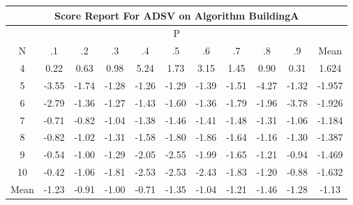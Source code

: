 \documentclass[11pt,a4paper]{report}
\begin{document}
\begin{longtable}{ | c || c | c | c | c | c | c | c | c | c || c |}
\hline
\multicolumn{11}{|c|}{ Score Report For ADSV on Algorithm BuildingA} \\
\hline
\multicolumn{11}{|c|}{ P } \\
\hline
N & .1 & .2 & .3 & .4 & .5 & .6 & .7 & .8 & .9 & Mean\\
 \hline
 \hline
 \endhead
  4 &  \cellcolor[HTML]{F7F7FF} 0.22 &  \cellcolor[HTML]{EFEFFF} 0.63 &  \cellcolor[HTML]{E7E7FF} 0.98 &  \cellcolor[HTML]{8080FF} 5.24 &  \cellcolor[HTML]{D7D7FF} 1.73 &  \cellcolor[HTML]{AFAFFF} 3.15 &  \cellcolor[HTML]{D7D7FF} 1.45 &  \cellcolor[HTML]{E7E7FF} 0.90 &  \cellcolor[HTML]{F7F7FF} 0.31 & 1.624 \\
  5 &  \cellcolor[HTML]{FFA7A7} -3.55 &  \cellcolor[HTML]{FFD7D7} -1.74 &  \cellcolor[HTML]{FFDFDF} -1.28 &  \cellcolor[HTML]{FFDFDF} -1.26 &  \cellcolor[HTML]{FFDFDF} -1.29 &  \cellcolor[HTML]{FFDFDF} -1.39 &  \cellcolor[HTML]{FFD7D7} -1.51 &  \cellcolor[HTML]{FF9797} -4.27 &  \cellcolor[HTML]{FFDFDF} -1.32 & -1.957 \\
  6 &  \cellcolor[HTML]{FFB7B7} -2.79 &  \cellcolor[HTML]{FFDFDF} -1.36 &  \cellcolor[HTML]{FFDFDF} -1.27 &  \cellcolor[HTML]{FFDFDF} -1.43 &  \cellcolor[HTML]{FFD7D7} -1.60 &  \cellcolor[HTML]{FFDFDF} -1.36 &  \cellcolor[HTML]{FFCFCF} -1.79 &  \cellcolor[HTML]{FFCFCF} -1.96 &  \cellcolor[HTML]{FF9F9F} -3.78 & -1.926 \\
  7 &  \cellcolor[HTML]{FFEFEF} -0.71 &  \cellcolor[HTML]{FFE7E7} -0.82 &  \cellcolor[HTML]{FFE7E7} -1.04 &  \cellcolor[HTML]{FFDFDF} -1.38 &  \cellcolor[HTML]{FFD7D7} -1.46 &  \cellcolor[HTML]{FFDFDF} -1.41 &  \cellcolor[HTML]{FFD7D7} -1.48 &  \cellcolor[HTML]{FFDFDF} -1.31 &  \cellcolor[HTML]{FFE7E7} -1.06 & -1.184 \\
  8 &  \cellcolor[HTML]{FFE7E7} -0.82 &  \cellcolor[HTML]{FFE7E7} -1.02 &  \cellcolor[HTML]{FFDFDF} -1.31 &  \cellcolor[HTML]{FFD7D7} -1.58 &  \cellcolor[HTML]{FFCFCF} -1.80 &  \cellcolor[HTML]{FFCFCF} -1.86 &  \cellcolor[HTML]{FFD7D7} -1.64 &  \cellcolor[HTML]{FFDFDF} -1.16 &  \cellcolor[HTML]{FFDFDF} -1.30 & -1.387 \\
  9 &  \cellcolor[HTML]{FFEFEF} -0.54 &  \cellcolor[HTML]{FFE7E7} -1.00 &  \cellcolor[HTML]{FFDFDF} -1.29 &  \cellcolor[HTML]{FFCFCF} -2.05 &  \cellcolor[HTML]{FFBFBF} -2.55 &  \cellcolor[HTML]{FFCFCF} -1.99 &  \cellcolor[HTML]{FFD7D7} -1.65 &  \cellcolor[HTML]{FFDFDF} -1.21 &  \cellcolor[HTML]{FFE7E7} -0.94 & -1.469 \\
  10 &  \cellcolor[HTML]{FFF7F7} -0.42 &  \cellcolor[HTML]{FFE7E7} -1.06 &  \cellcolor[HTML]{FFCFCF} -1.81 &  \cellcolor[HTML]{FFBFBF} -2.53 &  \cellcolor[HTML]{FFBFBF} -2.53 &  \cellcolor[HTML]{FFBFBF} -2.43 &  \cellcolor[HTML]{FFCFCF} -1.83 &  \cellcolor[HTML]{FFDFDF} -1.20 &  \cellcolor[HTML]{FFE7E7} -0.88 & -1.632 \\
 \hline
 \hline
Mean &  \cellcolor[HTML]{FFDFDF} -1.23 &  \cellcolor[HTML]{FFE7E7} -0.91 &  \cellcolor[HTML]{FFE7E7} -1.00 &  \cellcolor[HTML]{FFEFEF} -0.71 &  \cellcolor[HTML]{FFDFDF} -1.35 &  \cellcolor[HTML]{FFE7E7} -1.04 &  \cellcolor[HTML]{FFDFDF} -1.21 &  \cellcolor[HTML]{FFD7D7} -1.46 &  \cellcolor[HTML]{FFDFDF} -1.28 &  \cellcolor[HTML]{FFDFDF} -1.13
\end{longtable}
\end{document}
